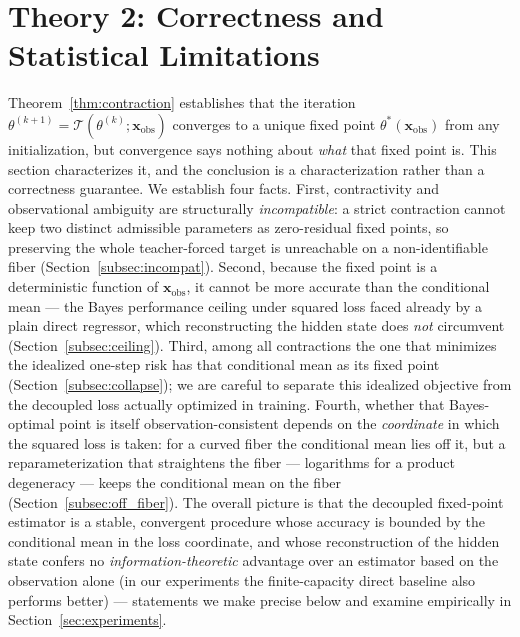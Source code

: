 \section{Theory 2: Correctness and Statistical Limitations}
\label{sec:correctness}

Theorem~\ref{thm:contraction} establishes that the iteration $\theta^{(k+1)} = \mathcal{T}(\theta^{(k)}; \mathbf{x}_\mathrm{obs})$ converges to a unique fixed point $\theta^*(\mathbf{x}_\mathrm{obs})$ from any initialization, but convergence says nothing about \emph{what} that fixed point is. This section characterizes it, and the conclusion is a characterization rather than a correctness guarantee. We establish four facts. First, contractivity and observational ambiguity are structurally \emph{incompatible}: a strict contraction cannot keep two distinct admissible parameters as zero-residual fixed points, so preserving the whole teacher-forced target is unreachable on a non-identifiable fiber (Section~\ref{subsec:incompat}). Second, because the fixed point is a deterministic function of $\mathbf{x}_\mathrm{obs}$, it cannot be more accurate than the conditional mean --- the Bayes performance ceiling under squared loss faced already by a plain direct regressor, which reconstructing the hidden state does \emph{not} circumvent (Section~\ref{subsec:ceiling}). Third, among all contractions the one that minimizes the idealized one-step risk has that conditional mean as its fixed point (Section~\ref{subsec:collapse}); we are careful to separate this idealized objective from the decoupled loss actually optimized in training. Fourth, whether that Bayes-optimal point is itself observation-consistent depends on the \emph{coordinate} in which the squared loss is taken: for a curved fiber the conditional mean lies off it, but a reparameterization that straightens the fiber --- logarithms for a product degeneracy --- keeps the conditional mean on the fiber (Section~\ref{subsec:off_fiber}). The overall picture is that the decoupled fixed-point estimator is a stable, convergent procedure whose accuracy is bounded by the conditional mean in the loss coordinate, and whose reconstruction of the hidden state confers no \emph{information-theoretic} advantage over an estimator based on the observation alone (in our experiments the finite-capacity direct baseline also performs better) --- statements we make precise below and examine empirically in Section~\ref{sec:experiments}.

